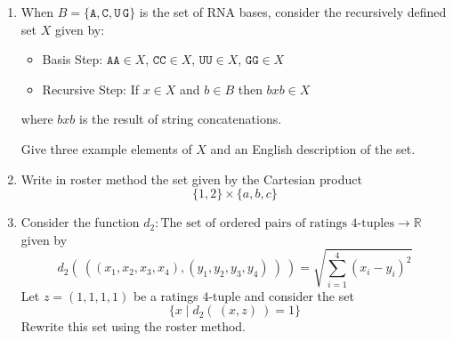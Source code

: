 \documentclass[12pt, oneside]{article}
\newcommand{\A}[0]{\texttt{A}}
\newcommand{\C}[0]{\texttt{C}}
\newcommand{\G}[0]{\texttt{G}}
\newcommand{\U}[0]{\texttt{U}}
\begin{document}
\begin{flushright}
\end{flushright} 
\begin{enumerate}

    \item When $B = \{ \A, \C, \U\, \G\}$ is the set of RNA bases, 
    consider the recursively defined set $X$ given by:
    \begin{itemize}
    \item[] Basis Step: $\A\A \in X$, $\C\C \in X$, $\U\U \in X$, $\G\G \in X$
    \item[] Recursive Step: If $x \in X$ and $b \in B$ then $bxb \in X$
    \end{itemize}
    where $bxb$ is the result of string concatenations.

    Give three example elements of $X$ and an English description of the set.

    \item Write in roster method the set given by the Cartesian product
    \[ 
        \{1,2\} \times \{a,b,c\}
    \]

    \item Consider the function $d_2: \textrm{The set of ordered pairs of ratings $4$-tuples} \to \mathbb{R}$
    given by 
    \[ 
        d_2 (~( (x_1, x_2, x_3, x_4), (y_1, y_2, y_3, y_4)~)~) = \sqrt{\sum_{i=1}^4 (x_i - y_i)^2}
    \]
    Let $z = (1,1,1,1)$ be a ratings $4$-tuple and consider the set
    \[
        \{ x \mid d_2 ( ~(x,z)~) = 1 \}
    \]
    Rewrite this set using the roster method.
\end{enumerate}
\end{document}
